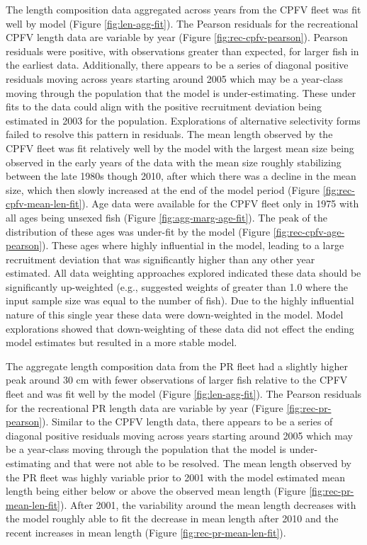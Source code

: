 \documentclass[11pt,
  english,
  letterpaper,
]{article}
\begin{document}
The length composition data aggregated across years from the CPFV fleet was fit well by model (Figure \ref{fig:len-agg-fit}). The Pearson residuals for the recreational CPFV length data are variable by year (Figure \ref{fig:rec-cpfv-pearson}). Pearson residuals were positive, with observations greater than expected, for larger fish in the earliest data. Additionally, there appears to be a series of diagonal positive residuals moving across years starting around 2005 which may be a year-class moving through the population that the model is under-estimating. These under fits to the data could align with the positive recruitment deviation being estimated in 2003 for the population. Explorations of alternative selectivity forms failed to resolve this pattern in residuals. The mean length observed by the CPFV fleet was fit relatively well by the model with the largest mean size being observed in the early years of the data with the mean size roughly stabilizing between the late 1980s though 2010, after which there was a decline in the mean size, which then slowly increased at the end of the model period (Figure \ref{fig:rec-cpfv-mean-len-fit}). Age data were available for the CPFV fleet only in 1975 with all ages being unsexed fish (Figure \ref{fig:agg-marg-age-fit}). The peak of the distribution of these ages was under-fit by the model (Figure \ref{fig:rec-cpfv-age-pearson}). These ages where highly influential in the model, leading to a large recruitment deviation that was significantly higher than any other year estimated. All data weighting approaches explored indicated these data should be significantly up-weighted (e.g., suggested weights of greater than 1.0 where the input sample size was equal to the number of fish). Due to the highly influential nature of this single year these data were down-weighted in the model. Model explorations showed that down-weighting of these data did not effect the ending model estimates but resulted in a more stable model.

The aggregate length composition data from the PR fleet had a slightly higher peak around 30 cm with fewer observations of larger fish relative to the CPFV fleet and was fit well by the model (Figure \ref{fig:len-agg-fit}). The Pearson residuals for the recreational PR length data are variable by year (Figure \ref{fig:rec-pr-pearson}). Similar to the CPFV length data, there appears to be a series of diagonal positive residuals moving across years starting around 2005 which may be a year-class moving through the population that the model is under-estimating and that were not able to be resolved. The mean length observed by the PR fleet was highly variable prior to 2001 with the model estimated mean length being either below or above the observed mean length (Figure \ref{fig:rec-pr-mean-len-fit}). After 2001, the variability around the mean length decreases with the model roughly able to fit the decrease in mean length after 2010 and the recent increases in mean length (Figure \ref{fig:rec-pr-mean-len-fit}).
\end{document}
